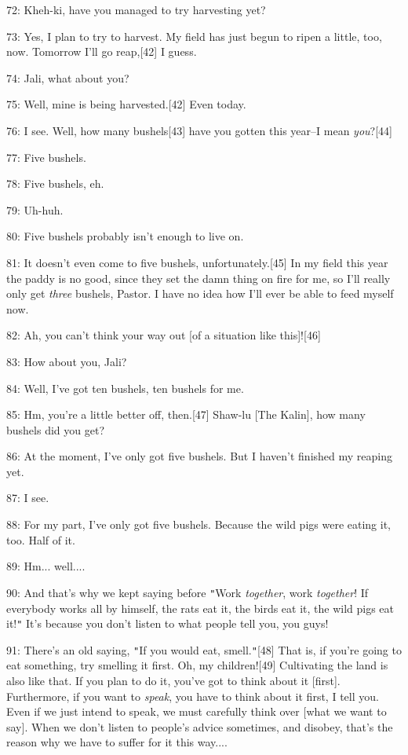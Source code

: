 72: Kheh-ki, have you managed to try harvesting yet?

73: Yes, I plan to try to harvest. My field has just begun to ripen a little, too,
now. Tomorrow I'll go reap,[42] I guess.

74: Jali, what about you?

75: Well, mine is being harvested.[42] Even today.

76: I see. Well, how many bushels[43] have you gotten this year--I mean \emph{you}?[44]

77: Five bushels.

78: Five bushels, eh.

79: Uh-huh.

80: Five bushels probably isn't enough to live on.

81: It doesn't even come to five bushels, unfortunately.[45] In my field this year
the paddy is no good, since they set the damn thing on fire for me, so I'll really
only get \textit{three} bushels, Pastor. I have no idea how I'll ever be able to
feed myself now.

82: Ah, you can't think your way out [of a situation like this]![46]

83: How about you, Jali?

84: Well, I've got ten bushels, ten bushels for me.

85: Hm, you're a little better off, then.[47] Shaw-lu [The Kalin], how many bushels
did you get?

86: At the moment, I've only got five bushels. But I haven't finished my reaping
yet.

87: I see.

88: For my part, I've only got five bushels. Because the wild pigs were eating
it, too. Half of it.

89: Hm... well....

90: And that's why we kept saying before \texttt{"}Work\textit{ together}, work
\textit{together}! If everybody works all by himself, the rats eat it, the birds
eat it, the wild pigs eat it!\texttt{"} It's because you don't listen to what people
tell you, you guys!

91: There's an old saying, \texttt{"}If you would eat, smell.\texttt{"}[48] That
is, if you're going to eat something, try smelling it first. Oh, my children![49]
Cultivating the land is also like that. If you plan to do it, you've got to think
about it [first]. Furthermore, if you want to \textit{speak}, you have to think
about it first, I tell you. Even if we just intend to speak, we must carefully
think over [what we want to say]. When we don't listen to people's advice sometimes,
and disobey, that's the reason why we have to suffer for it this way....

